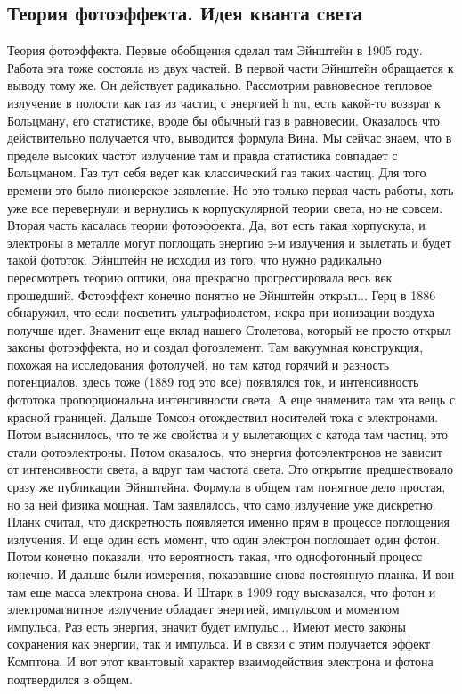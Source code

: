 \documentclass[a4paper, 12pt]{article}
\begin{document}
\subsection{Теория фотоэффекта. Идея кванта света}

Теория фотоэффекта. Первые обобщения сделал там Эйнштейн в 1905 году. 
Работа эта тоже состояла из двух частей. В первой части Эйнштейн 
обращается к выводу тому же. Он действует радикально. Рассмотрим 
равновесное тепловое излучение в полости как газ из частиц с энергией 
h nu, есть какой-то возврат к Больцману, его статистике, вроде бы 
обычный газ в равновесии. Оказалось что действительно получается что, 
выводится формула Вина. Мы сейчас знаем, что в пределе высоких частот 
излучение там и правда статистика совпадает с Больцманом. Газ тут себя 
ведет как классический газ таких частиц. Для того времени это было 
пионерское заявление. Но это только первая часть работы, хоть уже все 
перевернули и вернулись к корпускулярной теории света, но не совсем. 
Вторая часть касалась теории фотоэффекта. Да, вот есть такая корпускула, 
и электроны в металле могут поглощать энергию э-м излучения и вылетать 
и будет такой фототок. Эйнштейн не исходил из того, что нужно радикально 
пересмотреть теорию оптики, она прекрасно прогрессировала весь век 
прошедший. Фотоэффект конечно понятно не Эйнштейн открыл... Герц в 1886
обнаружил, что если посветить ультрафиолетом, искра при ионизации 
воздуха получше идет. Знаменит еще вклад нашего Столетова, который не 
просто открыл законы фотоэффекта, но и создал фотоэлемент. Там вакуумная 
конструкция, похожая на исследования фотолучей, но там катод горячий 
и разность потенциалов, здесь тоже (1889 год это все) появлялся ток, 
и интенсивность фототока пропорциональна интенсивности света. А еще 
знаменита там эта вещь с красной границей. Дальше Томсон отождествил 
носителей тока с электронами. Потом выяснилось, что те же свойства 
и у вылетающих с катода там частиц, это стали фотоэлектроны. Потом 
оказалось, что энергия фотоэлектронов не зависит от интенсивности света, 
а вдруг там частота света. Это открытие предшествовало сразу же 
публикации Эйнштейна. Формула в общем там понятное дело простая, но за 
ней физика мощная. Там заявлялось, что само излучение уже дискретно. 
Планк считал, что дискретность появляется именно прям в процессе 
поглощения излучения. И еще один есть момент, что один электрон 
поглощает один фотон. Потом конечно показали, что вероятность такая, что 
однофотонный процесс конечно. И дальше были измерения, показавшие снова 
постоянную планка. И вон там еще масса электрона снова. И Штарк в 1909 
году высказался, что фотон и электромагнитное излучение обладает 
энергией, импульсом и моментом импульса. Раз есть энергия, значит будет 
импульс... Имеют место законы сохранения как энергии, так и импульса. 
И в связи с этим получается эффект Комптона. И вот этот квантовый 
характер взаимодействия электрона и фотона подтвердился в общем.
\end{document}
